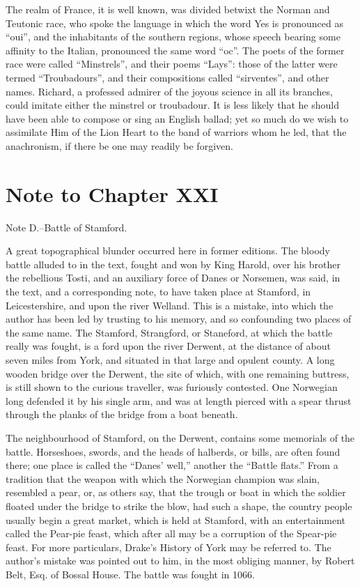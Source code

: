 The realm of France, it is well known, was divided betwixt the Norman
and Teutonic race, who spoke the language in which the word Yes is
pronounced as ``oui'', and the inhabitants of the southern regions,
whose speech bearing some affinity to the Italian, pronounced the same
word ``oc''. The poets of the former race were called ``Minstrels'', and
their poems ``Lays'': those of the latter were termed ``Troubadours'',
and their compositions called ``sirventes'', and other names. Richard, a
professed admirer of the joyous science in all its branches, could
imitate either the minstrel or troubadour. It is less likely that he
should have been able to compose or sing an English ballad; yet so much
do we wish to assimilate Him of the Lion Heart to the band of warriors
whom he led, that the anachronism, if there be one may readily be
forgiven.

\section*{Note to Chapter XXI}\label{noteCXXI}

Note D.--Battle of Stamford.

A great topographical blunder occurred here in former editions. The
bloody battle alluded to in the text, fought and won by King Harold,
over his brother the rebellious Tosti, and an auxiliary force of Danes
or Norsemen, was said, in the text, and a corresponding note, to have
taken place at Stamford, in Leicestershire, and upon the river Welland.
This is a mistake, into which the author has been led by trusting to his
memory, and so confounding two places of the same name. The Stamford,
Strangford, or Staneford, at which the battle really was fought, is a
ford upon the river Derwent, at the distance of about seven miles from
York, and situated in that large and opulent county. A long wooden
bridge over the Derwent, the site of which, with one remaining buttress,
is still shown to the curious traveller, was furiously contested. One
Norwegian long defended it by his single arm, and was at length pierced
with a spear thrust through the planks of the bridge from a boat
beneath.

The neighbourhood of Stamford, on the Derwent, contains some memorials
of the battle. Horseshoes, swords, and the heads of halberds, or bills,
are often found there; one place is called the ``Danes' well,'' another
the ``Battle flats.'' From a tradition that the weapon with which the
Norwegian champion was slain, resembled a pear, or, as others say, that
the trough or boat in which the soldier floated under the bridge to
strike the blow, had such a shape, the country people usually begin a
great market, which is held at Stamford, with an entertainment called
the Pear-pie feast, which after all may be a corruption of the Spear-pie
feast. For more particulars, Drake's History of York may be referred to.
The author's mistake was pointed out to him, in the most obliging
manner, by Robert Belt, Esq. of Bossal House. The battle was fought in
1066.

